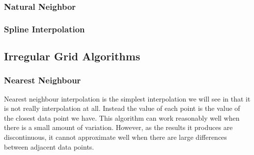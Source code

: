         
        \subsubsection{Natural Neighbor}\label{background_interpolation_methods_naturalneighbour}
        
        \subsubsection{Spline Interpolation}\label{background_interpolation_methods_splineinterpolation}

    \subsection{Irregular Grid Algorithms}\label{background_interpolation_methods_irregular_grid}




        \subsubsection{Nearest Neighbour}\label{background_interpolation_methods_nearest_neighbour}

            Nearest neighbour interpolation is the simplest interpolation we will see in that it is not really interpolation at all. Instead the value of each point is the value of the closest data point we have. This algorithm can work reasonably well when there is a small amount of variation. However, as the results it produces are discontinuous, it cannot approximate well when there are large differences between adjacent data points.


